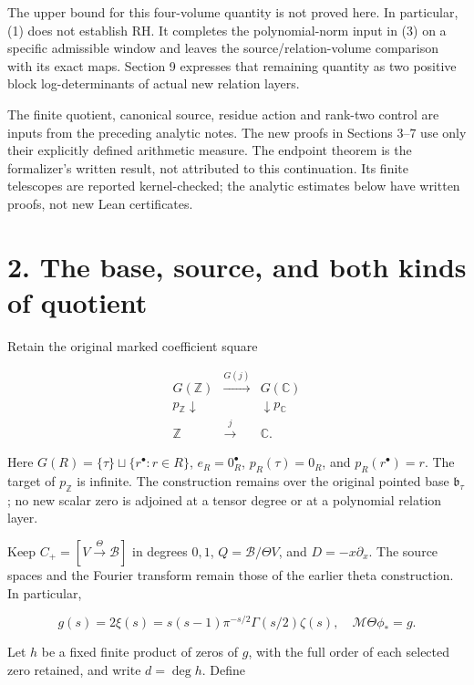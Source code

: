 \documentclass[
  11pt,
]{article}
\begin{document}
The upper bound for this four-volume quantity is not proved here. In
particular, (1) does not establish RH. It completes the polynomial-norm
input in (3) on a specific admissible window and leaves the
source/relation-volume comparison with its exact maps. Section 9
expresses that remaining quantity as two positive block log-determinants
of actual new relation layers.

The finite quotient, canonical source, residue action and rank-two
control are inputs from the preceding analytic notes. The new proofs in
Sections 3--7 use only their explicitly defined arithmetic measure. The
endpoint theorem is the formalizer's written result, not attributed to
this continuation. Its finite telescopes are reported kernel-checked;
the analytic estimates below have written proofs, not new Lean
certificates.

\section{2. The base, source, and both kinds of
quotient}\label{the-base-source-and-both-kinds-of-quotient}

Retain the original marked coefficient square

\[
\begin{array}{ccc}
 G(\mathbb Z)&\xrightarrow{G(j)}&G(\mathbb C)\\
 p_{\mathbb Z}\downarrow&&\downarrow p_{\mathbb C}\\
 \mathbb Z&\xrightarrow{j}&\mathbb C.
\end{array}                                                          \tag{5}
\]

Here \(G(R)=\{\tau\}\sqcup\{r^\bullet:r\in R\}\), \(e_R=0_R^\bullet\),
\(p_R(\tau)=0_R\), and \(p_R(r^\bullet)=r\). The target of
\(p_{\mathbb Z}\) is infinite. The construction remains over the
original pointed base \(\mathfrak b_\tau\); no new scalar zero is
adjoined at a tensor degree or at a polynomial relation layer.

Keep \(C_+=[V\xrightarrow{\Theta}\mathscr B]\) in degrees \(0,1\),
\(Q=\mathscr B/\Theta V\), and \(D=-x\partial_x\). The source spaces and
the Fourier transform remain those of the earlier theta construction. In
particular,

\[
 g(s)=2\xi(s)=s(s-1)\pi^{-s/2}\Gamma(s/2)\zeta(s),\quad
 \mathcal M\Theta\phi_*=g.                                            \tag{6}
\]

Let \(h\) be a fixed finite product of zeros of \(g\), with the full
order of each selected zero retained, and write \(d=\deg h\). Define
\end{document}
